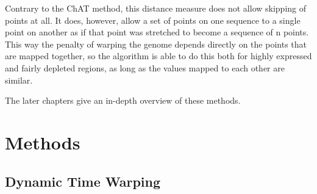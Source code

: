 \documentclass[parskip]{cs4rep}
\begin{document}
Contrary to the ChAT method, this distance measure does not allow skipping of points at all. It does, however, allow a set of points on one sequence to a single point on another as if that point was stretched to become a sequence of n points. This way the penalty of warping the genome depends directly on the points that are mapped together, so the algorithm is able to do this both for highly expressed and fairly depleted regions, as long as the values mapped to each other are similar.

The later chapters give an in-depth overview of these methods.

\chapter{Methods}
\section{Dynamic Time Warping}
\end{document}
